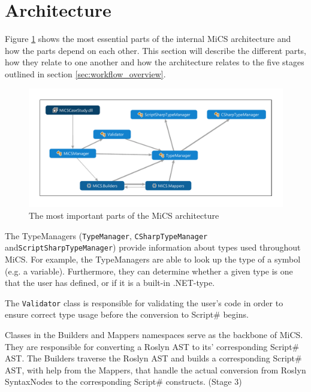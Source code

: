 \section{Architecture} %
\label{sec:architecture}
Figure \ref{fig:dependencygraph} shows the most essential parts of the internal MiCS architecture and how the parts depend on each other. 
This section will describe the different parts, how they relate to one another and how the architecture relates to the five stages outlined in section \ref{sec:workflow_overview}. 

\begin{figure}
	\begin{center}
		\centerline{\includegraphics[width=18cm]{resources/images/dependencygraph.pdf}}
	\end{center}
	\caption{The most important parts of the MiCS architecture}
	\label{fig:dependencygraph}
\end{figure}


The TypeManagers (\texttt{TypeManager}, \texttt{CSharpTypeManager} and\newline \texttt{ScriptSharpTypeManager}) provide information about types used throughout MiCS. For example, the TypeManagers are able to look up the type of a symbol (e.g. a variable). Furthermore, they can determine whether a given type is one that the user has defined, or if it is a built-in .NET-type.

The \texttt{Validator} class is responsible for validating the user's code in order to ensure correct type usage before the conversion to Script\# begins.

Classes in the Builders and Mappers namespaces serve as the backbone of MiCS. They are responsible for converting a Roslyn AST to its' corresponding Script\# AST. The Builders traverse the Roslyn AST and builds a corresponding Script\# AST, with help from the Mappers, that handle the actual conversion from Roslyn SyntaxNodes to the corresponding Script\# constructs. (Stage 3)

